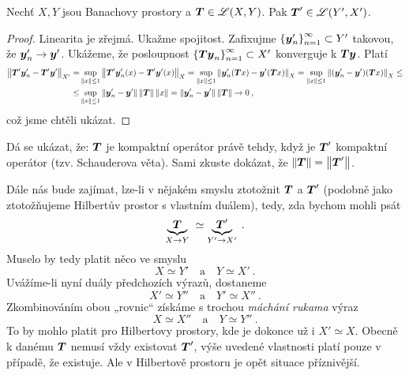 \begin{lemma}
Nechť $X,Y$ jsou Banachovy prostory a $\boldsymbol{T} \in \mathscr{L} (X,Y)$. Pak $\boldsymbol{T}' \in \mathscr{L}(Y', X')$.
\end{lemma}
\begin{proof}
Linearita je zřejmá. Ukažme spojitost.  Zafixujme $\left \lbrace \boldsymbol{y}'_n \right \rbrace_{n=1}^\infty \subset Y'$ takovou, že $\boldsymbol{y}'_n \rightarrow \boldsymbol{y}'$. Ukážeme, že posloupnost $\left \lbrace \boldsymbol{T} \boldsymbol{y}_n \right \rbrace_{n=1}^\infty \subset X'$ konverguje k $\boldsymbol{T} \boldsymbol{y}$. Platí
\begin{align*}
    \left\lVert\boldsymbol{T}' \boldsymbol{y}'_n - \boldsymbol{T}' \boldsymbol{y}'\right\rVert_{X'} 
    =&
    \sup_{\left\lVert x\right\rVert \leq 1} \left\lVert\boldsymbol{T}' \boldsymbol{y}'_n (x)- \boldsymbol{T}' \boldsymbol{y}' (x)\right\rVert_X 
    =
    \sup_{\left\lVert x\right\rVert \leq 1} \left\lVert\boldsymbol{y}'_n  (\boldsymbol{T} x)- \boldsymbol{y}' (\boldsymbol{T} x)\right\rVert_X 
    =
    \sup_{\left\lVert x\right\rVert \leq 1} \left\lVert(\boldsymbol{y}'_n-\boldsymbol{y}') (\boldsymbol{T} x)\right\rVert_X 
    \leq \\
    \leq&
     \sup_{\left\lVert x\right\rVert \leq 1} \left\lVert\boldsymbol{y}'_n - \boldsymbol{y}'\right\rVert \left\lVert\boldsymbol{T}\right\rVert \left\lVert x\right\rVert
    =
    \left\lVert\boldsymbol{y}'_n -\boldsymbol{y}'\right\rVert \left\lVert\boldsymbol{T}\right\rVert \rightarrow 0\:,
\end{align*}
což jsme chtěli ukázat.
\end{proof}
\begin{remark}
Dá se ukázat, že: $\boldsymbol{T}$ je kompaktní operátor právě tehdy, když je $\boldsymbol{T}'$ kompaktní operátor (tzv. Schauderova věta). Sami zkuste dokázat, že $\left\lVert\boldsymbol{T}\right\rVert = \left\lVert\boldsymbol{T}'\right\rVert$.
\end{remark}

\bigskip

Dále nás bude zajímat, lze-li v nějakém smyslu ztotožnit $\boldsymbol{T}$ a $\boldsymbol{T}'$ (podobně jako ztotožňujeme Hilbertův prostor s vlastním duálem), tedy, zda bychom mohli psát
$$
    \underbrace{\boldsymbol{T}}_{X \to Y} \;\simeq \underbrace{\boldsymbol{T}'}_{Y' \to X'} \:.
$$
Muselo by tedy platit něco ve smyslu
$$ X \simeq Y' \quad \text{a} \quad Y \simeq X' \: . $$
Uvážíme-li nyní duály předchozích výrazů, dostaneme
$$ X' \simeq Y'' \quad \text{a} \quad Y' \simeq X'' \: . $$
Zkombinováním obou „rovnic“ získáme s trochou \textit{máchání rukama} výraz
$$ X \simeq X'' \quad \text{a} \quad Y \simeq Y'' \: . $$
To by mohlo platit pro Hilbertovy prostory, kde je dokonce už i $X' \simeq X$. Obecně k danému $\boldsymbol{T}$ nemusí vždy existovat $\boldsymbol{T}'$, výše uvedené vlastnosti platí pouze v případě, že existuje. Ale v  Hilbertově prostoru je opět situace příznivější.

